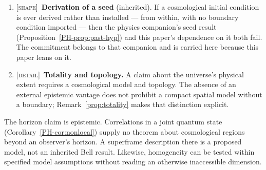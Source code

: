 \documentclass[11pt,a4paper]{article}
\theoremstyle{remark}\newtheorem{remark}[definition]{Remark}
\begin{document}
\begin{enumerate}[leftmargin=*]
\item \textsc{[shape]}~\textbf{Derivation of a seed} (inherited). If a cosmological initial condition
is ever derived rather than installed --- from within, with no boundary condition imported --- then the
physics companion's seed result (Proposition~\ref{PH-prop:past-hyp}) and this paper's dependence on it
both fail. The commitment belongs to that companion and is carried here because this paper leans on it.

\item \textsc{[detail]}~\textbf{Totality and topology.} A claim about the universe's physical
extent requires a cosmological model and topology. The absence of an external
epistemic vantage does not prohibit a compact spatial model without a boundary;
Remark~\ref{prop:totality} makes that distinction explicit.

\end{enumerate}

\noindent The horizon claim is epistemic. Correlations in a joint quantum state
(Corollary~\ref{PH-cor:nonlocal}) supply no theorem about cosmological regions
beyond an observer's horizon. A superframe description there is a proposed
model, not an inherited Bell result. Likewise, homogeneity can be tested within
specified model assumptions without reading an otherwise inaccessible dimension.
\end{document}
